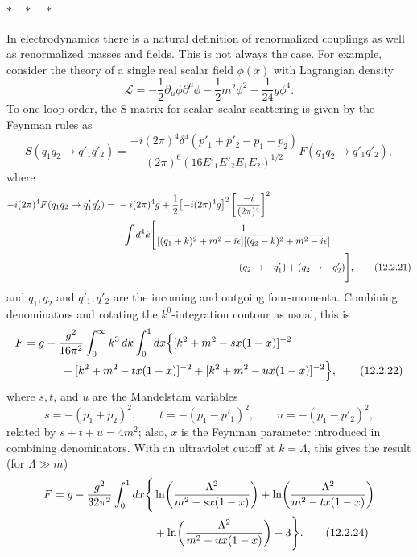 \begin{center}
  $*\quad *\quad *$
\end{center}

In electrodynamics there is a natural definition of renormalized couplings
as well as renormalized masses and fields. This is not always the case. For
example, consider the theory of a single real scalar field $\phi(x)$ with
Lagrangian density
\begin{equation}
  \mathcal{L}=-\frac12\partial_\mu\phi\partial^\mu\phi
  -\frac12m^2\phi^2-\frac1{24}g\phi^4.
  \tag{12.2.19}\label{eq:12.2.19}
\end{equation}
To one-loop order, the S-matrix for scalar--scalar scattering is given by the
Feynman rules as
\begin{equation}
  S(q_1q_2\to q'_1q'_2)
  =\frac{-i(2\pi)^4\delta^4(p'_1+p'_2-p_1-p_2)}
  {(2\pi)^6(16E'_1E'_2E_1E_2)^{1/2}}
  F(q_1q_2\to q'_1q'_2),
  \tag{12.2.20}\label{eq:12.2.20}
\end{equation}
where
\begin{align}
 -i(2\pi)^4F(q_1q_2\to q'_1q'_2)
 ={}&-i(2\pi)^4g
 +\frac12\bigl[-i(2\pi)^4g\bigr]^2
 \left[\frac{-i}{(2\pi)^4}\right]^2
 \notag\\
 &\cdot\int d^4k\Biggl[
 \frac{1}{[(q_1+k)^2+m^2-i\epsilon][(q_2-k)^2+m^2-i\epsilon]}
 \notag\\
 &\hspace{4.0cm}+(q_2\to-q'_1)+(q_2\to-q'_2)\Biggr],
 \tag{12.2.21}\label{eq:12.2.21}
\end{align}
and $q_1,q_2$ and $q'_1,q'_2$ are the incoming and outgoing four-momenta.
Combining denominators and rotating the $k^0$-integration contour as usual,
this is
\begin{align}
 F={}&g-\frac{g^2}{16\pi^2}\int_0^\infty k^3\,dk\int_0^1dx
 \Bigl\{[k^2+m^2-sx(1-x)]^{-2}
 \notag\\
 &\qquad+[k^2+m^2-tx(1-x)]^{-2}
       +[k^2+m^2-ux(1-x)]^{-2}\Bigr\},
 \tag{12.2.22}\label{eq:12.2.22}
\end{align}
where $s,t$, and $u$ are the Mandelstam variables
\begin{equation}
  s=-(p_1+p_2)^2,\qquad
  t=-(p_1-p'_1)^2,\qquad
  u=-(p_1-p'_2)^2,
  \tag{12.2.23}\label{eq:12.2.23}
\end{equation}
related by $s+t+u=4m^2$; also, $x$ is the Feynman parameter introduced in
combining denominators. With an ultraviolet cutoff at $k=\Lambda$, this gives
the result (for $\Lambda\gg m$)
\begin{align}
 F=g-\frac{g^2}{32\pi^2}\int_0^1dx\Biggl\{
 &\ln\!\left(\frac{\Lambda^2}{m^2-sx(1-x)}\right)
 +\ln\!\left(\frac{\Lambda^2}{m^2-tx(1-x)}\right)
 \notag\\
 &+\ln\!\left(\frac{\Lambda^2}{m^2-ux(1-x)}\right)-3\Biggr\}.
 \tag{12.2.24}\label{eq:12.2.24}
\end{align}
